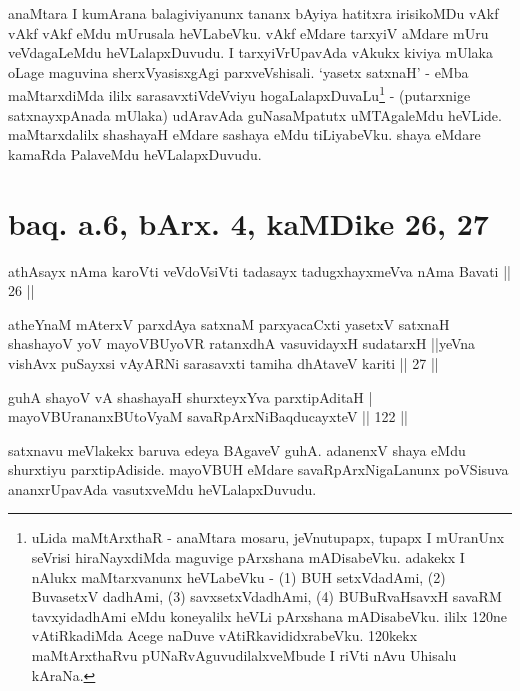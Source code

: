 \begin{artha}
anaMtara I kumArana balagiviyanunx tananx bAyiya hatitxra irisikoMDu 
vAkf vAkf vAkf eMdu mUrusala heVLabeVku. vAkf eMdare tarxyiV aMdare 
mUru veVdagaLeMdu heVLalapxDuvudu. I tarxyiVrUpavAda vAkukx kiviya 
mUlaka oLage maguvina sherxVyasisxgAgi parxveVshisali. `yasetx satxnaH' 
- eMba maMtarxdiMda ililx sarasavxtiVdeVviyu 
hogaLalapxDuvaLu\footnote[1]{uLida maMtArxthaR - anaMtara mosaru, 
jeVnutupapx, tupapx I mUranUnx seVrisi hiraNayxdiMda maguvige 
pArxshana mADisabeVku. adakekx I nAlukx maMtarxvanunx heVLabeVku - (1) 
BUH setxVdadAmi, (2) BuvasetxV dadhAmi, (3) savxsetxVdadhAmi, (4) 
BUBuRvaHsavxH savaRM tavxyidadhAmi eMdu koneyalilx heVLi pArxshana 
mADisabeVku. ililx 120ne vAtiRkadiMda Acege naDuve 
vAtiRkavididxrabeVku. 120kekx maMtArxthaRvu pUNaRvAguvudilalxveMbude I 
riVti nAvu Uhisalu kAraNa.} - (putarxnige satxnayxpAnada mUlaka) 
udAravAda guNasaMpatutx uMTAgaleMdu heVLide. maMtarxdalilx shashayaH 
eMdare sashaya eMdu tiLiyabeVku. shaya eMdare kamaRda PalaveMdu 
heVLalapxDuvudu.
\end{artha}

\section*{baq. a.6, bArx. 4, kaMDike 26, 27}

\begin{shl}
athAsayx nAma karoVti veVdoV\s siVti tadasayx tadugxhayxmeVva nAma Bavati || 26 ||
\end{shl}

\begin{shl}
atheYnaM mAterxV parxdAya satxnaM parxyacaCxti yasetxV satxnaH shashayoV yoV mayoVBUyoVR ratanxdhA vasuvidayxH sudatarxH ||yeVna vishAvx puSayxsi vAyARNi sarasavxti tamiha dhAtaveV kariti || 27 ||
\end{shl}

\begin{shl}
guhA shayoV vA shashayaH shurxteyxYva parxtipAditaH | \\
mayoVBUrananxBUtoV\s yaM savaRpArxNiBaqducayxteV \hfill|| 122 || 
\end{shl}

\begin{artha}
satxnavu meVlakekx baruva edeya BAgaveV guhA. adanenxV shaya eMdu 
shurxtiyu parxtipAdiside. mayoVBUH eMdare savaRpArxNigaLanunx 
poVSisuva ananxrUpavAda vasutxveMdu heVLalapxDuvudu.
\end{artha}

